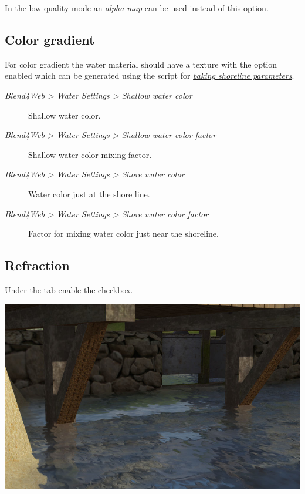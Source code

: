 \documentclass[a4paper,12pt,oneside]{sphinxmanual}
\begin{document}
In the low quality mode an {\hyperref[textures:texture-alpha-map]{\emph{alpha map}}} can be used instead of this option.


\subsection{Color gradient}
\label{outdoor_rendering:id9}
For color gradient the water material should have a texture with the  option enabled which can be generated using the script for {\hyperref[outdoor_rendering:shore-distance-bake]{\emph{baking shoreline parameters}}}.
\begin{description}
\item[{\emph{Blend4Web \textgreater{} Water Settings \textgreater{} Shallow water color}}] \leavevmode
Shallow water color.

\item[{\emph{Blend4Web \textgreater{} Water Settings \textgreater{} Shallow water color factor}}] \leavevmode
Shallow water color mixing factor.

\item[{\emph{Blend4Web \textgreater{} Water Settings \textgreater{} Shore water color}}] \leavevmode
Water color just at the shore line.

\item[{\emph{Blend4Web \textgreater{} Water Settings \textgreater{} Shore water color factor}}] \leavevmode
Factor for mixing water color just near the shoreline.

\end{description}


\subsection{Refraction}
\label{outdoor_rendering:id10}
Under the  tab enable the  checkbox.

{\hfill\includegraphics[width=1.000\linewidth]{water_refraction.jpg}\hfill}
\end{document}
